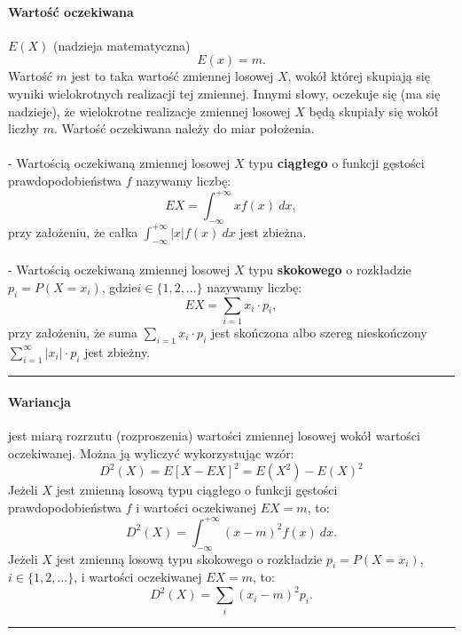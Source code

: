 \documentclass[a4paper,twoside]{report}
\begin{document}
\paragraph{Wartość oczekiwana} $E(X)$ (nadzieja matematyczna)
\begin{equation}
E(x) = m.
\end{equation}
Wartość $m$ jest to taka wartość zmiennej losowej $X$, wokół której skupiają się
wyniki wielokrotnych realizacji tej zmiennej. Innymi słowy, oczekuje się (ma
się nadzieje), że wielokrotne realizacje zmiennej losowej $X$ będą skupiały się
wokół liczby $m$. Wartość oczekiwana należy do miar położenia. \\\\
- Wartością oczekiwaną zmiennej losowej $X$ typu \textbf{ciągłego} o funkcji gęstości prawdopodobieństwa $f$ nazywamy liczbę:
\begin{equation}
EX = \int_{-\infty}^{+ \infty} xf(x)~dx,
\end{equation}
przy założeniu, że całka $\int_{-\infty}^{+ \infty} |x|f(x)~dx$ jest zbieżna.\\\\
- Wartością oczekiwaną zmiennej losowej $X$ typu \textbf{skokowego} o rozkładzie $p_i=P(X=x_i)$, gdzie\linebreak $i\in \{1,2,...\}$ nazywamy liczbę:
\begin{equation}
EX = \sum_{i=1} x_i \cdot  p_i,
\end{equation}
przy założeniu, że suma $\sum_{i=1} x_i \cdot  p_i$ jest skończona albo szereg nieskończony $\sum_{i=1}^{\infty} |x_i| \cdot  p_i$ jest zbieżny.
\rule{\textwidth}{1pt}
\paragraph{Wariancja} jest miarą rozrzutu (rozproszenia) wartości zmiennej losowej wokół wartości oczekiwanej. Można ją wyliczyć wykorzystując wzór:
\begin{equation}
D^2(X) = E[X - EX]^2 = E(X^2)-E(X)^2
\end{equation}
Jeżeli $X$ jest zmienną losową typu ciągłego o funkcji gęstości prawdopodobieństwa $f$ i wartości oczekiwanej $EX=m$, to:
\begin{equation}
D^2(X) = \int_{-\infty}^{+ \infty} (x-m)^2f(x)~dx.
\end{equation}
Jeżeli $X$ jest zmienną losową typu skokowego o rozkładzie $p_i=P(X=x_i)$, $i \in \{1,2,...\}$, i wartości oczekiwanej $EX=m$, to:
\begin{equation}
D^2(X) = \sum_{i} (x_i -m)^2p_i.
\end{equation}
\rule{\textwidth}{1pt}
\end{document}
